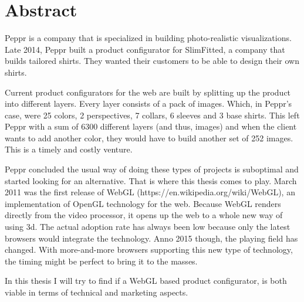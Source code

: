 \newpage
\section{Abstract}

Peppr is a company that is specialized in building photo-realistic visualizations. Late 2014, Peppr built a product configurator for SlimFitted, a company that builds tailored shirts. They wanted their customers to be able to design their own shirts. 

Current product configurators for the web are built by splitting up the product into different layers. Every layer consists of a pack of images. Which, in Peppr's case, were 25 colors, 2 perspectives, 7 collars, 6 sleeves and 3 base shirts. This left Peppr with a sum of 6300 different layers (and thus, images) and when the client wants to add another color, they would have to build another set of 252 images. This is a timely and costly venture.

Peppr concluded the usual way of doing these types of projects is suboptimal and started looking for an alternative. That is where this thesis comes to play. March 2011 was the first release of WebGL (https://en.wikipedia.org/wiki/WebGL), an implementation of OpenGL technology for the web. Because WebGL renders directly from the video processor, it opens up the web to a whole new way of using 3d. The actual adoption rate has always been low because only the latest browsers would integrate the technology. Anno 2015 though, the playing field has changed. With more-and-more browsers supporting this new type of technology, the timing might be perfect to bring it to the masses.

In this thesis I will try to find if a WebGL based product configurator, is both viable in terms of technical and marketing aspects.
\newpage